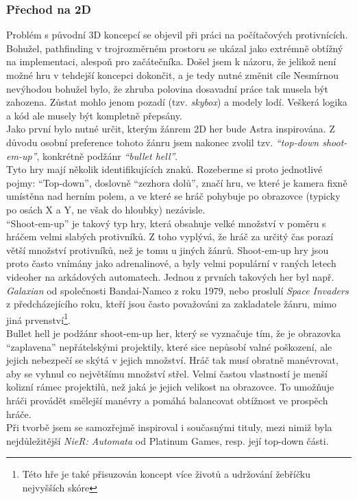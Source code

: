 \documentclass[12pt,a4paper,hidelinks]{article}
\begin{document}
\subsubsection{Přechod na 2D}
Problém s původní 3D koncepcí se objevil při práci na počítačových protivnících. Bohužel, pathfinding v trojrozměrném prostoru se ukázal jako extrémně obtížný na implementaci, alespoň pro začátečníka. Došel jsem k názoru, že jelikož není možné hru v tehdejší koncepci dokončit, a je tedy nutné změnit cíle Nesmírnou nevýhodou bohužel bylo, že zhruba polovina dosavadní práce tak musela být zahozena. Zůstat mohlo jenom pozadí (tzv. \textit{skybox}) a modely lodí. Veškerá logika a kód ale musely být kompletně přepsány.\\
Jako první bylo nutné určit, kterým žánrem 2D her bude Astra inspirována. Z důvodu osobní preference tohoto žánru jsem nakonec zvolil tzv. \textit{\enquote{top-down shoot-em-up}}, konkrétně podžánr \textit{\enquote{bullet hell}}.\\
Tyto hry mají několik identifikujících znaků. Rozeberme si proto jednotlivé pojmy:
\enquote{Top-down}, doslovně \enquote{zezhora dolů}, značí hru, ve které je kamera fixně umístěna nad herním polem, a ve které se hráč pohybuje po obrazovce (typicky po osách X a Y, ne však do hloubky) nezávisle.\\
\enquote{Shoot-em-up} je takový typ hry, která obsahuje velké množství v poměru s hráčem velmi slabých protivníků. Z toho vyplývá, že hráč za určitý čas porazí větší množství protivníků, než je tomu u jiných žánrů. Shoot-em-up hry jsou proto často vnímány jako adrenalinové, a byly velmi populární v raných letech videoher na arkádových automatech. Jednou z prvních takových her byl např. \textit{Galaxian} od společnosti Bandai-Namco z roku 1979, nebo proslulí \textit{Space Invaders} z předcházejícího roku, kteří jsou často považováni za zakladatele žánru, mimo jiná prvenství\footnote{Této hře je také přisuzován koncept více životů a udržování žebříčku nejvyšších skóre}.\\
Bullet hell je podžánr shoot-em-up her, který se vyznačuje tím, že je obrazovka \enquote{zaplavena} nepřátelskými projektily, které sice nepůsobí valné poškození, ale jejich nebezpečí se skýtá v jejich množství. Hráč tak musí obratně manévrovat, aby se vyhnul co největšímu množství střel. Velmi častou vlastností je menší kolizní rámec projektilů, než jaká je jejich velikost na obrazovce. To umožňuje hráči provádět smělejší manévry a pomáhá balancovat obtížnost ve prospěch hráče.\\
Při tvorbě jsem se samozřejmě inspiroval i současnými tituly, mezi nimiž byla nejdůležitější \textit{NieR: Automata} od Platinum Games, resp. její top-down části.\\
\end{document}
